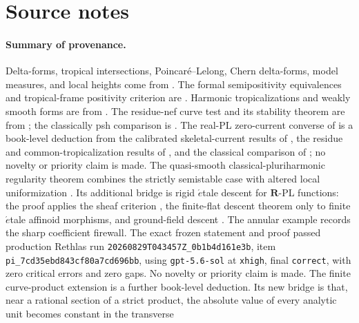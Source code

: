 \section*{Source notes}
\label{sec:appM-source-notes}

\paragraph{Summary of provenance.}
Delta-forms, tropical intersections, Poincar\'e--Lelong, Chern delta-forms,
model measures, and local heights come from \cite{GK17}.  The formal
semipositivity equivalences and tropical-frame positivity criterion are
\cite{GK19}.  Harmonic tropicalizations and weakly smooth forms are from
\cite{GJR26}.  The residue-nef curve test and its stability theorem are from
\cite{GR25PL}; the classically psh comparison is \cite{GR25Classical}.
The real-PL zero-current converse of
 is a book-level deduction from
the calibrated skeletal-current results of \cite{CLD25}, the residue and
common-tropicalization results of \cite{GJR26}, and the classical comparison
of \cite{GR25Classical}; no novelty or priority claim is made.
The quasi-smooth classical-pluriharmonic regularity theorem
 combines the strictly semistable case
\cite[Proposition~7.8]{GR25Classical} with altered local uniformization
\cite[Corollary~3.3.2]{Temkin17}.  Its additional bridge is rigid
\(\acute{e}\)tale descent for \(\mathbf R\)-PL functions: the proof applies
the sheaf criterion \cite[Proposition~3.2.2]{dJvdP96}, the finite-flat
descent theorem \cite[Proposition~5.11]{GJR26} only to finite
\(\acute{e}\)tale affinoid morphisms, and ground-field descent
\cite[Corollary~5.12]{GJR26}.  The annular example
 records the sharp coefficient
firewall.  The exact frozen statement and proof passed production Rethlas
run \nolinkurl{20260829T043457Z_0b1b4d161e3b}, item
\nolinkurl{pi_7cd35ebd843cf80a7cd696bb}, using \texttt{gpt-5.6-sol} at
\texttt{xhigh}, final \texttt{correct}, with zero critical errors and zero
gaps.  No novelty or priority claim is made.
The finite curve-product extension
 is a further book-level deduction.
Its new bridge is that, near a rational section of a strict product, the
absolute value of every analytic unit becomes constant in the transverse
